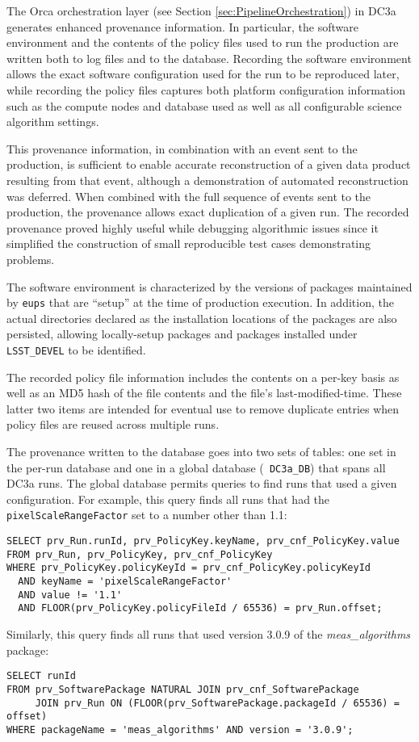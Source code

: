 
The Orca orchestration layer (see Section
\ref{sec:PipelineOrchestration}) in DC3a generates enhanced provenance
information.  In particular, the software environment and the contents
of the policy files used to run the production are written both to log
files and to the database.  Recording the software environment allows
the exact software configuration used for the run to be reproduced
later, while recording the policy files captures both platform
configuration information such as the compute nodes and database used as
well as all configurable science algorithm settings.

This provenance information, in combination with an event sent to the
production, is sufficient to enable accurate reconstruction of a given
data product resulting from that event, although a demonstration of
automated reconstruction was deferred.  When combined with the full
sequence of events sent to the production, the provenance allows exact
duplication of a given run.  The recorded provenance proved highly
useful while debugging algorithmic issues since it simplified the
construction of small reproducible test cases demonstrating problems.

The software environment is characterized by the versions of packages
maintained by {\tt eups} that are ``setup'' at the time of production
execution.  In addition, the actual directories declared as the
installation locations of the packages are also persisted, allowing
locally-setup packages and packages installed under {\tt LSST\_DEVEL} to
be identified.

The recorded policy file information includes the contents on a per-key
basis as well as an MD5 hash of the file contents and the file's
last-modified-time.  These latter two items are intended for eventual
use to remove duplicate entries when policy files are reused across
multiple runs.

The provenance written to the database goes into two sets of tables: one
set in the per-run database and one in a global database ({\tt
DC3a\_DB}) that spans all DC3a runs.  The global database permits
queries to find runs that used a given configuration.  For example, this
query finds all runs that had the {\tt pixelScaleRangeFactor} set to a
number other than 1.1:

\begin{verbatim}
SELECT prv_Run.runId, prv_PolicyKey.keyName, prv_cnf_PolicyKey.value
FROM prv_Run, prv_PolicyKey, prv_cnf_PolicyKey
WHERE prv_PolicyKey.policyKeyId = prv_cnf_PolicyKey.policyKeyId
  AND keyName = 'pixelScaleRangeFactor'
  AND value != '1.1'
  AND FLOOR(prv_PolicyKey.policyFileId / 65536) = prv_Run.offset;
\end{verbatim}

Similarly, this query finds all runs that used version 3.0.9 of the {\it
meas\_algorithms} package:

\begin{verbatim}
SELECT runId
FROM prv_SoftwarePackage NATURAL JOIN prv_cnf_SoftwarePackage
     JOIN prv_Run ON (FLOOR(prv_SoftwarePackage.packageId / 65536) = offset)
WHERE packageName = 'meas_algorithms' AND version = '3.0.9';
\end{verbatim}


